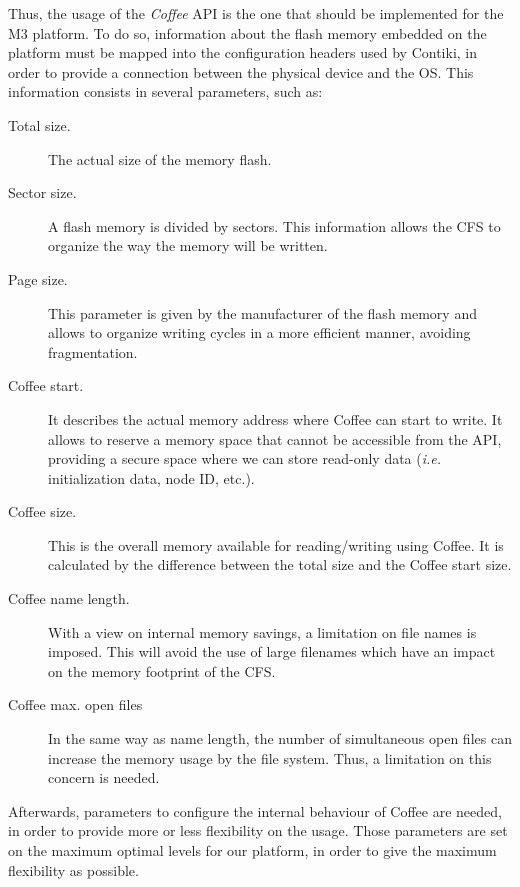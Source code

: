 Thus, the usage of the \textit{Coffee} API is the one that should be implemented for the M3 platform.
To do so, information about the flash memory embedded on the platform must be mapped into the configuration headers used by Contiki, in order to provide a connection between the physical device and the OS.
This information consists in several parameters, such as:
\begin{description}
	\item[Total size.] The actual size of the memory flash.
	\item[Sector size.] A flash memory is divided by sectors. This information allows the CFS to organize the way the memory will be written.
	\item[Page size.] This parameter is given by the manufacturer of the flash memory and allows to organize writing cycles in a more efficient manner, avoiding fragmentation.
	\item[Coffee start.] It describes the actual memory address where Coffee can start to write. It allows to reserve a memory space that cannot be accessible from the API, providing a secure space where we can store read-only data (\textit{i.e.} initialization data, node ID, etc.).
	\item[Coffee size.] This is the overall memory available for reading/writing using Coffee. It is calculated by the difference between the total size and the Coffee start size.
	\item[Coffee name length.] With a view on internal memory savings, a limitation on file names is imposed. This will avoid the use of large filenames which have an impact on the memory footprint of the CFS.
	\item[Coffee max. open files] In the same way as name length, the number of simultaneous open files can increase the memory usage by the file system. Thus, a limitation on this concern is needed.
\end{description}

Afterwards, parameters to configure the internal behaviour of Coffee are needed, in order to provide more or less flexibility on the usage.
Those parameters are set on the maximum optimal levels for our platform, in order to give the maximum flexibility as possible.

